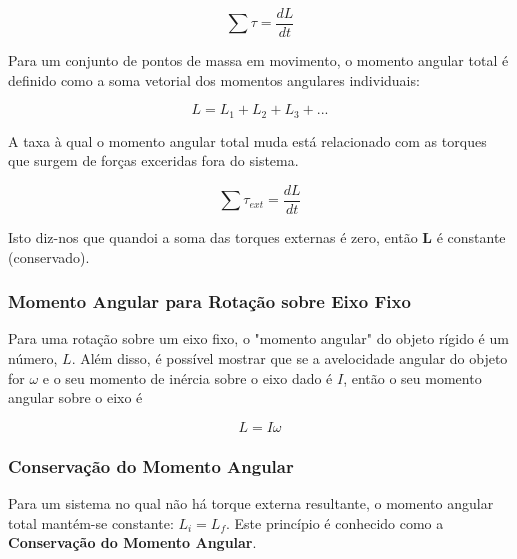 \begin{equation}
    \sum \tau=\frac{dL}{dt}
\end{equation}

Para um conjunto de pontos de massa em movimento, o momento angular total é definido como a soma vetorial dos momentos angulares individuais:

\begin{equation*}
    L=L_1+L_2+L_3+...
\end{equation*}

A taxa à qual o momento angular total muda está relacionado com as torques que surgem de forças exceridas fora do sistema.

\begin{equation}
    \sum \tau_{ext}=\frac{dL}{dt}
\end{equation}

Isto diz-nos que quandoi a soma das torques externas é zero, então \textbf{L} é constante (conservado).

\subsubsection{Momento Angular para Rotação sobre Eixo Fixo}
Para uma rotação sobre um eixo fixo, o "momento angular" do objeto rígido é um número, $L$. Além disso, é possível mostrar que se a avelocidade angular do objeto for $\omega$ e o seu momento de inércia sobre o eixo dado é $I$, então o seu momento angular sobre o eixo é

\begin{equation}
    L=I\omega
\end{equation}

\subsubsection{Conservação do Momento Angular}
Para um sistema no qual não há torque externa resultante, o momento angular total mantém-se constante: $L_i=L_f$. Este princípio é conhecido como a \textbf{Conservação do Momento Angular}.
